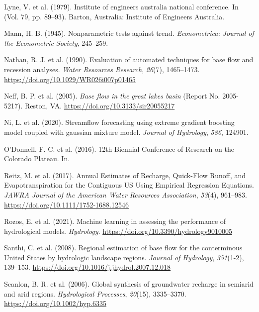 \documentclass[
]{agujournal2019}
\newlength{\cslhangindent}
\newenvironment{CSLReferences}[2] %
 {\begin{list}{}{%
  \setlength{\itemindent}{0pt}
  \setlength{\leftmargin}{0pt}
  \setlength{\parsep}{0pt}
  \ifodd #1
   \setlength{\leftmargin}{\cslhangindent}
   \setlength{\itemindent}{-1\cslhangindent}
  \fi
  \setlength{\itemsep}{#2\baselineskip}}}
 {\end{list}}
\begin{document}
\begin{CSLReferences}{1}{0}
Lyne, V. et al. (1979). Institute of engineers australia national
conference. In (Vol. 79, pp. 89--93). Barton, Australia: Institute of
Engineers Australia.

Mann, H. B. (1945). Nonparametric tests against trend.
\emph{Econometrica: Journal of the Econometric Society}, 245--259.

Nathan, R. J. et al. (1990). Evaluation of automated techniques for base
flow and recession analyses. \emph{Water Resources Research},
\emph{26}(7), 1465--1473. \url{https://doi.org/10.1029/WR026i007p01465}

Neff, B. P. et al. (2005). \emph{Base flow in the great lakes basin}
(Report No. 2005-5217). Reston, VA.
\url{https://doi.org/10.3133/sir20055217}

Ni, L. et al. (2020). Streamflow forecasting using extreme gradient
boosting model coupled with gaussian mixture model. \emph{Journal of
Hydrology}, \emph{586}, 124901.

O'Donnell, F. C. et al. (2016). 12th Biennial Conference of Research on
the Colorado Plateau. In.

Reitz, M. et al. (2017). Annual Estimates of Recharge, Quick{-}Flow
Runoff, and Evapotranspiration for the Contiguous US Using Empirical
Regression Equations. \emph{JAWRA Journal of the American Water
Resources Association}, \emph{53}(4), 961--983.
\url{https://doi.org/10.1111/1752-1688.12546}

Rozos, E. et al. (2021). Machine learning in assessing the performance
of hydrological models. \emph{Hydrology}.
\url{https://doi.org/10.3390/hydrology9010005}

Santhi, C. et al. (2008). Regional estimation of base flow for the
conterminous United States by hydrologic landscape regions.
\emph{Journal of Hydrology}, \emph{351}(1-2), 139--153.
\url{https://doi.org/10.1016/j.jhydrol.2007.12.018}

Scanlon, B. R. et al. (2006). Global synthesis of groundwater recharge
in semiarid and arid regions. \emph{Hydrological Processes},
\emph{20}(15), 3335--3370. \url{https://doi.org/10.1002/hyp.6335}


\end{CSLReferences}
\end{document}
